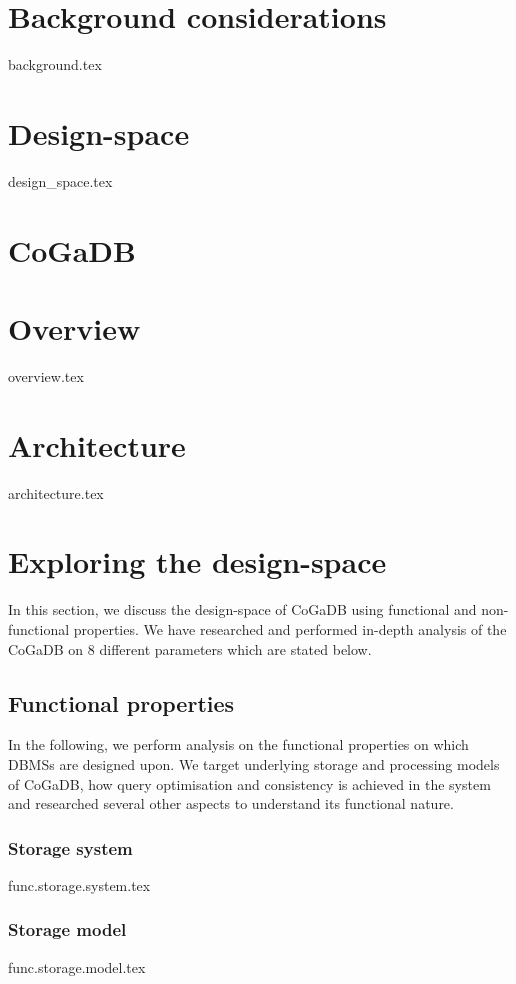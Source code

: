\documentclass[a4paper, 11pt]{article}
\begin{document}
\section*{Background considerations}
{background.tex}

\section*{Design-space}
{design_space.tex}

\section*{CoGaDB}
\section*{Overview}
{overview.tex}

\section*{Architecture}
{architecture.tex}

\section*{Exploring the design-space}
In this section, we discuss the design-space of CoGaDB using functional and non-functional properties. We have researched and performed in-depth analysis of the CoGaDB on 8 different parameters which are stated below.

\subsection*{Functional properties}
In the following, we perform analysis on the functional properties on which DBMSs are designed upon. We target underlying storage and processing models of CoGaDB, how query optimisation and consistency is achieved in the system and researched several other aspects to understand its functional nature.

\subsubsection*{Storage system}
{func.storage.system.tex}

\subsubsection*{Storage model}
{func.storage.model.tex}
\end{document}
